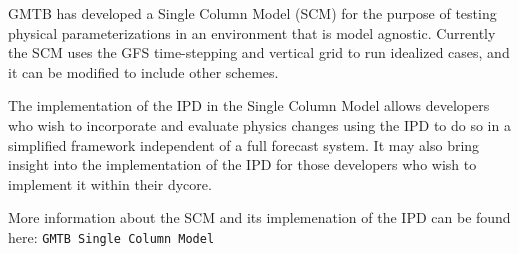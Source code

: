 G\+M\+TB has developed a Single Column Model (S\+CM) for the purpose of testing physical parameterizations in an environment that is model agnostic. Currently the S\+CM uses the G\+FS time-\/stepping and vertical grid to run idealized cases, and it can be modified to include other schemes.

The implementation of the I\+PD in the Single Column Model allows developers who wish to incorporate and evaluate physics changes using the I\+PD to do so in a simplified framework independent of a full forecast system. It may also bring insight into the implementation of the I\+PD for those developers who wish to implement it within their dycore.

More information about the S\+CM and its implemenation of the I\+PD can be found here\+: {\tt G\+M\+TB Single Column Model} 